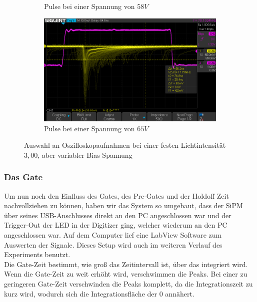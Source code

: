 \documentclass[12pt]{article}
\begin{document}
\begin{figure}[h!]
\begin{subfigure}{0.49\textwidth}
    \caption{Pulse bei einer Spannung von $58V$}
  \end{subfigure}
  \hfill
  \begin{subfigure}{0.49\textwidth}
    \includegraphics[width=\textwidth]{Grafiken/4-1-4/4-4-65}
    \caption{Pulse bei einer Spannung von $65V$}
  \end{subfigure}
  \caption{Auswahl an Oszilloskopaufnahmen bei einer festen Lichtintensität $3,00$, aber variabler Bias-Spannung}
  \label{SpannungsänderungPuls}
\end{figure}

\subsubsection{Das Gate}
Um nun noch den Einfluss des Gates, des Pre-Gates und der Holdoff Zeit nachvollziehen zu können, haben wir das System so umgebaut, dass der SiPM über seines USB-Anschlusses direkt an den PC angeschlossen war und der Trigger-Out der LED in der Digitizer ging, welcher wiederum an den PC angeschlossen war. Auf dem Computer lief eine LabView Software zum Auswerten der Signale. Dieses Setup wird auch im weiteren Verlauf des Experiments benutzt. \\
Die Gate-Zeit bestimmt, wie groß das Zeitintervall ist, über das integriert wird.
Wenn die Gate-Zeit zu weit erhöht wird, verschwimmen die Peaks.
Bei einer zu geringeren Gate-Zeit verschwinden die Peaks komplett, da die Integrationszeit zu kurz wird, wodurch sich die Integrationsfläche der $0$ annähert.
\end{document}
